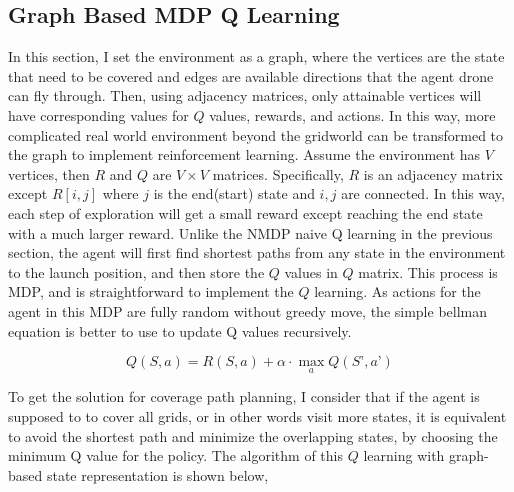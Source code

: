 \documentclass{article}
\begin{document}
\subsection{Graph Based MDP Q Learning}

\hspace{\parindent} In this section, I set the environment as a graph, where the vertices are the state that need to be covered and edges are available directions that the agent drone can fly through. Then, using adjacency matrices, only attainable vertices will have corresponding values for $Q$ values, rewards, and actions. In this way, more complicated real world environment beyond the gridworld can be transformed to the graph to implement reinforcement learning\cite{GBQL}. Assume the environment has $V$ vertices, then $R$ and $Q$ are $V\times V$ matrices. Specifically, $R$ is an adjacency matrix except $R[i,j]$ where $j$ is the end(start) state and $i, j$ are connected. In this way, each step of exploration will get a small reward except reaching the end state with a much larger reward. Unlike the NMDP naive Q learning in the previous section, the agent will first find shortest paths from any state in the environment to the launch position, and then store the $Q$ values in $Q$ matrix. This process is MDP, and is straightforward to implement the $Q$ learning. As actions for the agent in this MDP are fully random without greedy move, the simple bellman equation is better to use to update Q values recursively\cite{drl_5}.

\begin{equation}
    Q(S,a) = R(S,a) + \alpha \cdot \max_a Q(S’, a’)
\end{equation}

To get the solution for coverage path planning, I consider that if the agent is supposed to to cover all grids, or in other words visit more states, it is equivalent to avoid the shortest path and minimize the overlapping states, by choosing the minimum Q value for the policy. The algorithm of this $Q$ learning with graph-based state representation is shown below,
\end{document}
